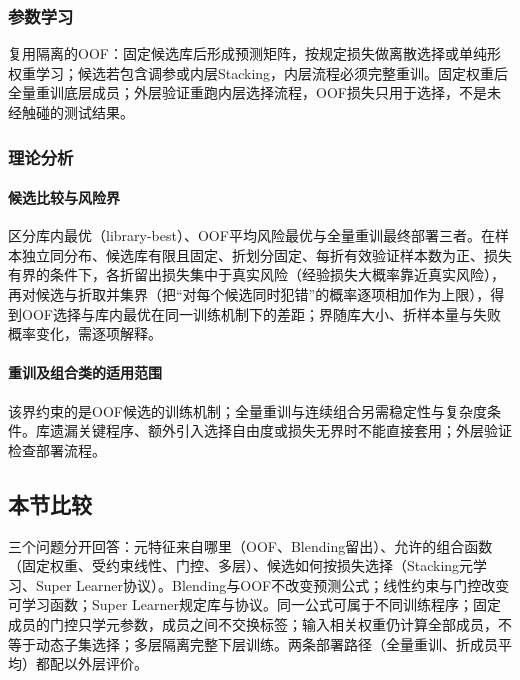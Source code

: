 \subsubsection{参数学习}
复用隔离的OOF：固定候选库后形成预测矩阵，按规定损失做离散选择或单纯形权重学习；候选若包含调参或内层Stacking，内层流程必须完整重训。固定权重后全量重训底层成员；外层验证重跑内层选择流程，OOF损失只用于选择，不是未经触碰的测试结果。

\subsubsection{理论分析}

\paragraph{候选比较与风险界}
区分库内最优（library-best）、OOF平均风险最优与全量重训最终部署三者。在样本独立同分布、候选库有限且固定、折划分固定、每折有效验证样本数为正、损失有界的条件下，各折留出损失集中于真实风险（经验损失大概率靠近真实风险），再对候选与折取并集界（把“对每个候选同时犯错”的概率逐项相加作为上限），得到OOF选择与库内最优在同一训练机制下的差距；界随库大小、折样本量与失败概率变化，需逐项解释。

\paragraph{重训及组合类的适用范围}
该界约束的是OOF候选的训练机制；全量重训与连续组合另需稳定性与复杂度条件。库遗漏关键程序、额外引入选择自由度或损失无界时不能直接套用；外层验证检查部署流程。

\subsection{本节比较}
\label{sec:ensemble-stacking-comparison}
三个问题分开回答：元特征来自哪里（OOF、Blending留出）、允许的组合函数（固定权重、受约束线性、门控、多层）、候选如何按损失选择（Stacking元学习、Super Learner协议）。Blending与OOF不改变预测公式；线性约束与门控改变可学习函数；Super Learner规定库与协议。同一公式可属于不同训练程序；固定成员的门控只学元参数，成员之间不交换标签；输入相关权重仍计算全部成员，不等于动态子集选择；多层隔离完整下层训练。两条部署路径（全量重训、折成员平均）都配以外层评价。

